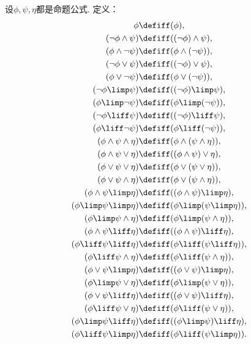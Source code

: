 \begin{definition}\label{definition:命题逻辑.逻辑联结词的优先顺序}
设\(\phi,\psi,\eta\)都是命题公式.
定义：\begin{gather}
	\phi
	\defiff
	(\phi), \\
	(\neg\phi\land\psi)
	\defiff
	((\neg\phi)\land\psi), \\
	(\phi\land\neg\psi)
	\defiff
	(\phi\land(\neg\psi)), \\
	(\neg\phi\lor\psi)
	\defiff
	((\neg\phi)\lor\psi), \\
	(\phi\lor\neg\psi)
	\defiff
	(\phi\lor(\neg\psi)), \\
	(\neg\phi\limp\psi)
	\defiff
	((\neg\phi)\limp\psi), \\
	(\phi\limp\neg\psi)
	\defiff
	(\phi\limp(\neg\psi)), \\
	(\neg\phi\liff\psi)
	\defiff
	((\neg\phi)\liff\psi), \\
	(\phi\liff\neg\psi)
	\defiff
	(\phi\liff(\neg\psi)), \\
	(\phi\land\psi\land\eta)
	\defiff
	(\phi\land(\psi\land\eta)), \\
	(\phi\land\psi\lor\eta)
	\defiff
	((\phi\land\psi)\lor\eta), \\
	(\phi\lor\psi\lor\eta)
	\defiff
	(\phi\lor(\psi\lor\eta)), \\
	(\phi\lor\psi\land\eta)
	\defiff
	(\phi\lor(\psi\land\eta)), \\
	(\phi\land\psi\limp\eta)
	\defiff
	((\phi\land\psi)\limp\eta), \\
	(\phi\limp\psi\limp\eta)
	\defiff
	(\phi\limp(\psi\limp\eta)), \\
	(\phi\limp\psi\land\eta)
	\defiff
	(\phi\limp(\psi\land\eta)), \\
	(\phi\land\psi\liff\eta)
	\defiff
	((\phi\land\psi)\liff\eta), \\
	(\phi\liff\psi\liff\eta)
	\defiff
	(\phi\liff(\psi\liff\eta)), \\
	(\phi\liff\psi\land\eta)
	\defiff
	(\phi\liff(\psi\land\eta)), \\
	(\phi\lor\psi\limp\eta)
	\defiff
	((\phi\lor\psi)\limp\eta), \\
	(\phi\limp\psi\lor\eta)
	\defiff
	(\phi\limp(\psi\lor\eta)), \\
	(\phi\lor\psi\liff\eta)
	\defiff
	((\phi\lor\psi)\liff\eta), \\
	(\phi\liff\psi\lor\eta)
	\defiff
	(\phi\liff(\psi\lor\eta)), \\
	(\phi\limp\psi\liff\eta)
	\defiff
	((\phi\limp\psi)\liff\eta), \\
	(\phi\liff\psi\limp\eta)
	\defiff
	(\phi\liff(\psi\limp\eta)).
\end{gather}
\end{definition}

